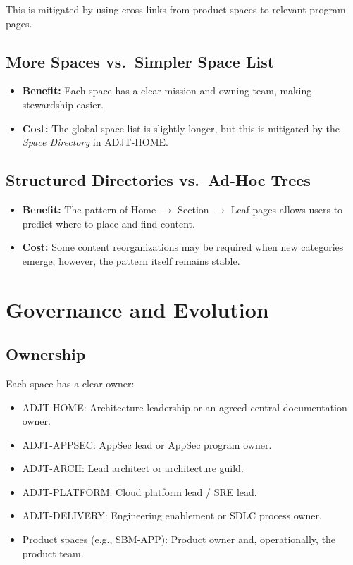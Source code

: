 \documentclass[11pt]{article}
\begin{document}
This is mitigated by using cross-links from product spaces to relevant
program pages.

\subsection{More Spaces vs.\ Simpler Space List}

\begin{itemize}[leftmargin=*]
  \item \textbf{Benefit:} Each space has a clear mission and owning
        team, making stewardship easier.
  \item \textbf{Cost:} The global space list is slightly longer, but
        this is mitigated by the \emph{Space Directory} in ADJT-HOME.
\end{itemize}

\subsection{Structured Directories vs.\ Ad-Hoc Trees}

\begin{itemize}[leftmargin=*]
  \item \textbf{Benefit:} The pattern of Home $\rightarrow$ Section
        $\rightarrow$ Leaf pages allows users to predict where to
        place and find content.
  \item \textbf{Cost:} Some content reorganizations may be required
        when new categories emerge; however, the pattern itself
        remains stable.
\end{itemize}

\section{Governance and Evolution}

\subsection{Ownership}

Each space has a clear owner:

\begin{itemize}[leftmargin=*]
  \item ADJT-HOME: Architecture leadership or an agreed central
        documentation owner.
  \item ADJT-APPSEC: AppSec lead or AppSec program owner.
  \item ADJT-ARCH: Lead architect or architecture guild.
  \item ADJT-PLATFORM: Cloud platform lead / SRE lead.
  \item ADJT-DELIVERY: Engineering enablement or SDLC process owner.
  \item Product spaces (e.g., SBM-APP): Product owner and,
        operationally, the product team.
\end{itemize}
\end{document}
